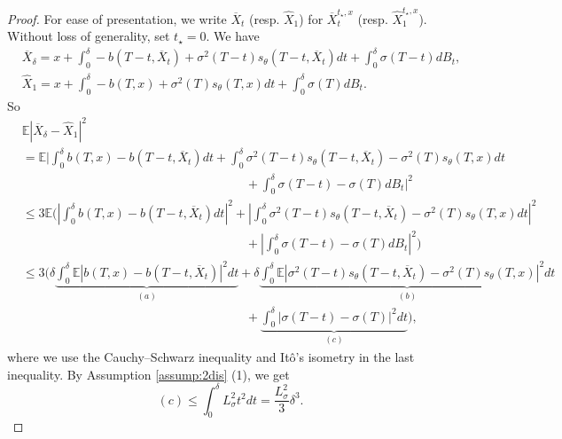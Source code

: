 \documentclass[letterpaper,11pt,reqno]{amsart}
\numberwithin{equation}{section}
\begin{document}
\begin{proof}
For ease of presentation, 
we write $\overline{X}_{t}$ (resp. $\widehat{X}_1$) 
for $\overline{X}^{t_\star, x}_t$ (resp. $\widehat{X}^{t_\star, x}_1$).
Without loss of generality, set $t_\star = 0$.
We have
\begin{equation*}
\begin{aligned}
& \overline{X}_\delta = x + \int_0^\delta -b(T-t, \overline{X}_t) + \sigma^2(T-t) s_\theta(T-t, \overline{X}_t) dt + \int_0^\delta \sigma(T-t) dB_t, \\
& \widehat{X}_1 = x + \int_0^\delta -b(T,x) + \sigma^2(T) s_\theta(T,x) dt
+ \int_0^\delta \sigma(T) dB_t.
\end{aligned}
\end{equation*}
So
\begin{equation}
\label{eq:diffthree}
\begin{aligned}
& \mathbb{E}|\overline{X}_\delta -\widehat{X}_1|^2  \\
& = \mathbb{E} \bigg|\int_0^\delta b(T,x) - b(T-t, \overline{X}_t) dt + 
\int_0^\delta \sigma^2(T-t) s_\theta(T-t, \overline{X}_t) -\sigma^2(T) s_\theta(T,x) dt  \\
& \qquad \qquad \qquad \qquad \qquad \qquad \qquad \qquad \qquad + \int_0^\delta \sigma (T-t) - \sigma(T) dB_t \bigg|^2 \\
&\le 3 \mathbb{E} \bigg( \left|\int_0^\delta b(T,x) - b(T-t, \overline{X}_t) dt\right|^2
+ \left| \int_0^\delta \sigma^2(T-t) s_\theta(T-t, \overline{X}_t) -\sigma^2(T) s_\theta(T,x) dt\right|^2 \\
&  \qquad \qquad \qquad \qquad \qquad \qquad \qquad \qquad \qquad +
\left| \int_0^\delta \sigma (T-t) - \sigma(T) dB_t \right|^2 \bigg) \\
& \le 3 \bigg(\delta  \underbrace{\int_0^\delta \mathbb{E} |b(T,x) - b(T-t, \overline{X}_t)|^2 dt}_{(a)} + \delta \underbrace{\int_0^\delta \mathbb{E} |\sigma^2(T-t) s_\theta(T-t, \overline{X}_t) -\sigma^2(T) s_\theta(T,x)|^2 dt}_{(b)} \\
& \qquad \qquad \qquad \qquad \qquad \qquad \qquad \qquad \qquad +
\underbrace{\int_0^\delta |\sigma(T-t) - \sigma(T)|^2 dt}_{(c)} \bigg),
\end{aligned}
\end{equation}
where we use the Cauchy–Schwarz inequality and It\^o's isometry in the last inequality. 
By Assumption \ref{assump:2dis} (1), we get
\begin{equation}
\label{eq:diffthreec}
(c) \le \int_0^\delta L_\sigma^2 t^2 dt = \frac{L_\sigma^2}{3} \delta^3.

\end{equation}
\end{proof}
\end{document}
